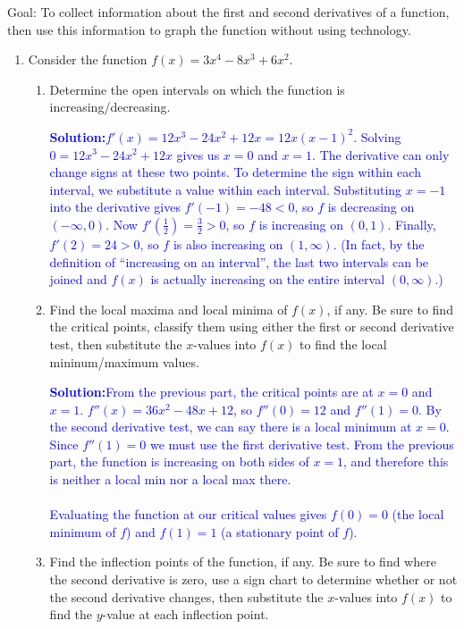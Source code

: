 \documentclass[letterpaper,11pt]{article}
\newcommand{\sol}[2]{\begin{minipage}[c][#1]{\linewidth}{\textcolor{blue}{\textbf{Solution:}}\quad \textcolor{blue}{#2}}\end{minipage}}
\newcommand{\sol}[2]{\begin{minipage}[c][#1]{\linewidth}{\vfill}\end{minipage}}
\begin{document}



\noindent Goal:  To collect information about the first and second derivatives of a function, then use this information to
graph the function without using technology.
 
\begin{enumerate} 
\item Consider the function 
$ f(x) = 3x^4-8x^3+6x^2$.
\begin{enumerate}
\item Determine the open intervals on which the function is increasing/decreasing.

\sol{1.6 in}{$f'(x)=12x^3-24x^2+12x = 12x(x-1)^2$. Solving $0=12x^3-24x^2+12x$ gives us $x=0$ and $x=1$. The derivative can only change signs at these two points.  To determine the sign within each interval, we substitute a value within each interval. Substituting $x=-1$ into the derivative gives $f'(-1) = -48 < 0$, so $f$ is decreasing on $(-\infty, 0)$.  Now $f'(\frac{1}{2}) = \frac{3}{2} > 0$, so $f$ is increasing on $(0,1)$.  Finally, $f'(2) = 24 > 0$, so $f$ is also increasing on $(1, \infty)$. (In fact, by the definition of ``increasing on an interval'', the last two intervals can be joined and $f(x)$ is actually increasing on the entire interval $(0,\infty)$.)}

\item Find the local maxima and local minima of $f(x)$, if any.  Be sure to find the critical points, classify them using either the first or second derivative test, then substitute the $x$-values into $f(x)$ to find the local mininum/maximum values.

\sol{1.9in}{From the previous part, the critical points are at $x=0$ and $x=1$. $f''(x)=36x^2-48x+12$, so $f''(0)=12$ and $f''(1)=0$. By the second derivative test, we can say there is a local minimum at $x=0$. Since $f''(1)=0$ we must use the first derivative test. From the previous part, the function is increasing on both sides of $x=1$, and therefore this is neither a local min nor a local max there. \\\\
Evaluating the function at our critical values gives $f(0)=0$ (the local minimum of $f$) and $f(1)=1$ (a stationary point of $f$).}

\item Find the inflection points of the function, if any.  Be sure to find where the second derivative is zero, use a sign chart to determine whether or not the second derivative changes, then substitute the $x$-values into $f(x)$ to find the $y$-value at each inflection point.


\end{enumerate}
\end{enumerate}
\end{document}
